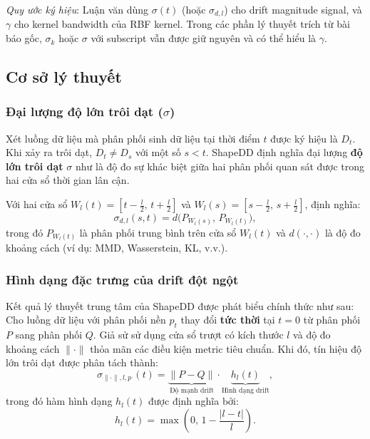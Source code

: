 \textit{Quy ước ký hiệu}: Luận văn dùng $\sigma(t)$ (hoặc $\sigma_{d,l}$) cho drift magnitude signal, và $\gamma$ cho kernel bandwidth của RBF kernel. Trong các phần lý thuyết trích từ bài báo gốc, $\sigma_k$ hoặc $\sigma$ với subscript vẫn được giữ nguyên và có thể hiểu là $\gamma$.

\subsection{Cơ sở lý thuyết}

\subsubsection{Đại lượng độ lớn trôi dạt (\texorpdfstring{$\sigma$}{σ})}

Xét luồng dữ liệu mà phân phối sinh dữ liệu tại thời điểm $t$ được ký hiệu là $D_t$. Khi xảy ra trôi dạt, $D_t \neq D_s$ với một số $s < t$.
ShapeDD định nghĩa đại lượng \textbf{độ lớn trôi dạt} $\sigma$ như là độ đo sự khác biệt giữa hai phân phối quan sát được trong hai cửa sổ thời gian lân cận.

Với hai cửa sổ $W_l(t) = [t - \frac{l}{2}, \, t + \frac{l}{2}]$ và $W_l(s) = [s - \frac{l}{2}, \, s + \frac{l}{2}]$, định nghĩa:
\begin{equation}
	\sigma_{d,l}(s,t) = d \big( P_{W_l(s)}, \, P_{W_l(t)} \big),
\end{equation}
trong đó $P_{W_l(t)}$ là phân phối trung bình trên cửa sổ $W_l(t)$ và $d(\cdot,\cdot)$ là độ đo khoảng cách (ví dụ: MMD, Wasserstein, KL, v.v.).

\subsubsection{Hình dạng đặc trưng của drift đột ngột}
\label{thm:triangle_shape}
Kết quả lý thuyết trung tâm của ShapeDD được phát biểu chính thức như sau: Cho luồng dữ liệu với phân phối nền $p_t$ thay đổi \textbf{tức thời} tại $t=0$ từ phân phối $P$ sang phân phối $Q$. Giả sử sử dụng cửa sổ trượt có kích thước $l$ và độ đo khoảng cách $\|\cdot\|$ thỏa mãn các điều kiện metric tiêu chuẩn. Khi đó, tín hiệu độ lớn trôi dạt được phân tách thành:
\begin{equation}
	\sigma_{\parallel \cdot \parallel, l, p^\cdot}(t)
	= \underbrace{ \| P - Q \| }_{\text{Độ mạnh drift}} \cdot
	\underbrace{ h_l(t) }_{\text{Hình dạng drift}},
\end{equation}
trong đó hàm hình dạng $h_l(t)$ được định nghĩa bởi:
\begin{equation}
	h_l(t) = \max\left( 0, \, 1 - \frac{|l - t|}{l} \right).
\end{equation}

